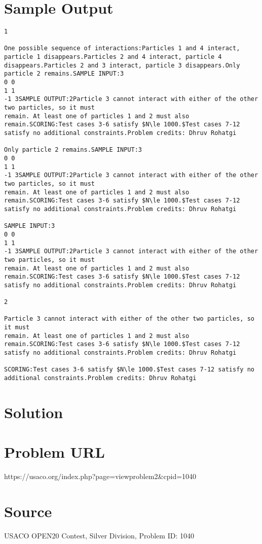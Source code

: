 \documentclass[12pt]{article}
\begin{document}
\section*{Sample Output}
\begin{verbatim}
1

One possible sequence of interactions:Particles 1 and 4 interact, particle 1 disappears.Particles 2 and 4 interact, particle 4 disappears.Particles 2 and 3 interact, particle 3 disappears.Only particle 2 remains.SAMPLE INPUT:3
0 0
1 1
-1 3SAMPLE OUTPUT:2Particle 3 cannot interact with either of the other two particles, so it must
remain. At least one of particles 1 and 2 must also remain.SCORING:Test cases 3-6 satisfy $N\le 1000.$Test cases 7-12 satisfy no additional constraints.Problem credits: Dhruv Rohatgi

Only particle 2 remains.SAMPLE INPUT:3
0 0
1 1
-1 3SAMPLE OUTPUT:2Particle 3 cannot interact with either of the other two particles, so it must
remain. At least one of particles 1 and 2 must also remain.SCORING:Test cases 3-6 satisfy $N\le 1000.$Test cases 7-12 satisfy no additional constraints.Problem credits: Dhruv Rohatgi

SAMPLE INPUT:3
0 0
1 1
-1 3SAMPLE OUTPUT:2Particle 3 cannot interact with either of the other two particles, so it must
remain. At least one of particles 1 and 2 must also remain.SCORING:Test cases 3-6 satisfy $N\le 1000.$Test cases 7-12 satisfy no additional constraints.Problem credits: Dhruv Rohatgi

2

Particle 3 cannot interact with either of the other two particles, so it must
remain. At least one of particles 1 and 2 must also remain.SCORING:Test cases 3-6 satisfy $N\le 1000.$Test cases 7-12 satisfy no additional constraints.Problem credits: Dhruv Rohatgi

SCORING:Test cases 3-6 satisfy $N\le 1000.$Test cases 7-12 satisfy no additional constraints.Problem credits: Dhruv Rohatgi
\end{verbatim}

\section*{Solution}


\section*{Problem URL}
https://usaco.org/index.php?page=viewproblem2&cpid=1040

\section*{Source}
USACO OPEN20 Contest, Silver Division, Problem ID: 1040
\end{document}
